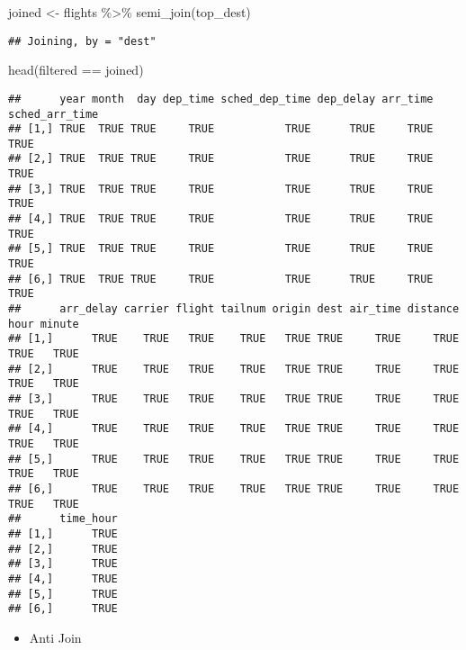 \documentclass[
]{book}
\newenvironment{Shaded}{\begin{snugshade}}{\end{snugshade}}
\newcommand{\FunctionTok}[1]{\textcolor[rgb]{0.00,0.00,0.00}{#1}}
\newcommand{\NormalTok}[1]{#1}
\newcommand{\OtherTok}[1]{\textcolor[rgb]{0.56,0.35,0.01}{#1}}
\newcommand{\SpecialCharTok}[1]{\textcolor[rgb]{0.00,0.00,0.00}{#1}}
\providecommand{\tightlist}{%
  \setlength{\itemsep}{0pt}\setlength{\parskip}{0pt}}
\begin{document}
\begin{Shaded}
\begin{Highlighting}[]
\NormalTok{joined }\OtherTok{\textless{}{-}}\NormalTok{ flights }\SpecialCharTok{\%\textgreater{}\%}
  \FunctionTok{semi\_join}\NormalTok{(top\_dest)}
\end{Highlighting}
\end{Shaded}

\begin{verbatim}
## Joining, by = "dest"
\end{verbatim}

\begin{Shaded}
\begin{Highlighting}[]
\FunctionTok{head}\NormalTok{(filtered }\SpecialCharTok{==}\NormalTok{ joined)}
\end{Highlighting}
\end{Shaded}

\begin{verbatim}
##      year month  day dep_time sched_dep_time dep_delay arr_time sched_arr_time
## [1,] TRUE  TRUE TRUE     TRUE           TRUE      TRUE     TRUE           TRUE
## [2,] TRUE  TRUE TRUE     TRUE           TRUE      TRUE     TRUE           TRUE
## [3,] TRUE  TRUE TRUE     TRUE           TRUE      TRUE     TRUE           TRUE
## [4,] TRUE  TRUE TRUE     TRUE           TRUE      TRUE     TRUE           TRUE
## [5,] TRUE  TRUE TRUE     TRUE           TRUE      TRUE     TRUE           TRUE
## [6,] TRUE  TRUE TRUE     TRUE           TRUE      TRUE     TRUE           TRUE
##      arr_delay carrier flight tailnum origin dest air_time distance hour minute
## [1,]      TRUE    TRUE   TRUE    TRUE   TRUE TRUE     TRUE     TRUE TRUE   TRUE
## [2,]      TRUE    TRUE   TRUE    TRUE   TRUE TRUE     TRUE     TRUE TRUE   TRUE
## [3,]      TRUE    TRUE   TRUE    TRUE   TRUE TRUE     TRUE     TRUE TRUE   TRUE
## [4,]      TRUE    TRUE   TRUE    TRUE   TRUE TRUE     TRUE     TRUE TRUE   TRUE
## [5,]      TRUE    TRUE   TRUE    TRUE   TRUE TRUE     TRUE     TRUE TRUE   TRUE
## [6,]      TRUE    TRUE   TRUE    TRUE   TRUE TRUE     TRUE     TRUE TRUE   TRUE
##      time_hour
## [1,]      TRUE
## [2,]      TRUE
## [3,]      TRUE
## [4,]      TRUE
## [5,]      TRUE
## [6,]      TRUE
\end{verbatim}

\begin{itemize}
\tightlist
\item
  Anti Join
\end{itemize}
\end{document}
